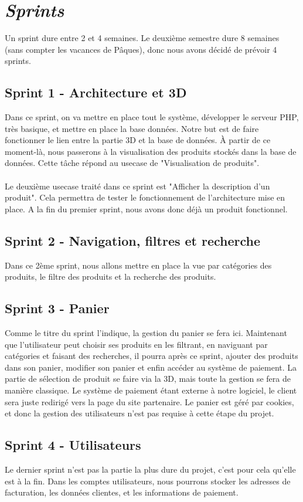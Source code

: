 \documentclass[12pt]{article}
\begin{document}
\newpage
\section{\textit{Sprints}}
Un sprint dure entre 2 et 4 semaines. Le deuxième semestre dure 8 semaines (sans compter les vacances de Pâques), donc nous avons décidé de prévoir 4 sprints.

\subsection{Sprint 1 - Architecture et 3D}
Dans ce sprint, on va mettre en place tout le système, développer le serveur PHP, très basique, et mettre en place la base données.
Notre but est de faire fonctionner le lien entre la partie 3D et la base de données.
À partir de ce moment-là, nous passerons à la visualisation des produits stockés dans la base de données. Cette tâche répond au usecase de "Visualisation de produits".\\\\
Le deuxième usecase traité dans ce sprint est "Afficher la description d'un produit". Cela permettra de tester le fonctionnement de l'architecture mise en place.
A la fin du premier sprint, nous avons donc déjà un produit fonctionnel.

\subsection{Sprint 2 - Navigation, filtres et recherche}
Dans ce 2ème sprint, nous allons mettre en place la vue par catégories des produits, le filtre des produits et la recherche des produits.

\subsection{Sprint 3 - Panier}
Comme le titre du sprint l'indique, la gestion du panier se fera ici. Maintenant que l'utilisateur peut choisir ses produits en les filtrant, en naviguant
par catégories et faisant des recherches, il pourra après ce sprint, ajouter des produits dans son panier, modifier son panier et enfin accéder au système de paiement.
La partie de sélection de produit se faire via la 3D, mais toute la gestion se fera de manière classique.
Le système de paiement étant externe à notre logiciel, le client sera juste redirigé vers la page du site partenaire.
Le panier est géré par cookies, et donc la gestion des utilisateurs n'est pas requise à cette étape du projet.

\subsection{Sprint 4 - Utilisateurs}
Le dernier sprint n'est pas la partie la plus dure du projet, c'est pour cela qu'elle est à la fin.
Dans les comptes utilisateurs, nous pourrons stocker les adresses de facturation, les données clientes, et les informations de paiement.
\end{document}
